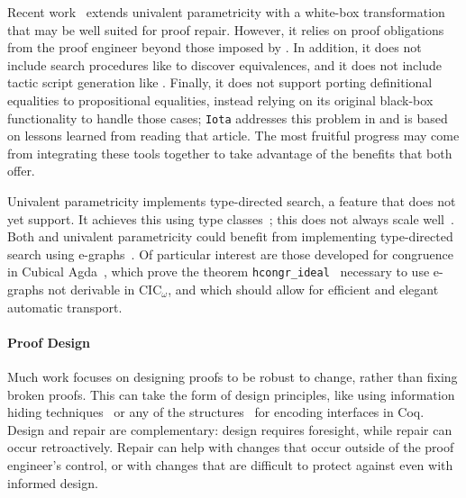 Recent work~\cite{tabareau2019marriage} extends univalent parametricity with 
a white-box transformation that may be well suited for proof repair.
However, it relies on proof obligations from the proof engineer beyond those imposed by \toolname.
In addition, it does not include search procedures like \toolname to discover equivalences,
and it does not include tactic script generation like \toolname.
Finally, it does not support porting definitional equalities to propositional equalities,
instead relying on its original black-box functionality to handle those cases;
\lstinline{Iota} addresses this problem in \toolname and is based on lessons learned from reading that article.
The most fruitful progress may come from integrating these tools together to take advantage of the benefits that both offer.

Univalent parametricity implements type-directed search, a feature that \toolname does not yet support.
It achieves this using type classes~\cite{Sozeau2008}; this does not always scale well~\cite{tabareau2019marriage}.
Both \toolname and univalent parametricity could benefit from implementing type-directed search using e-graphs~\cite{egraph1}.
Of particular interest are those developed for congruence in Cubical Agda~\cite{egraph6},
which prove the theorem \lstinline{hcongr_ideal}~\cite{egraph7} necessary to use e-graphs not derivable in CIC$_{\omega}$,
and which should allow for efficient and elegant automatic transport.

\paragraph{Proof Design}

Much work focuses on designing proofs
to be robust to change, rather than fixing broken proofs.
This can take the form of design principles, like using 
information hiding techniques~\cite{Woos:2016:PCF:2854065.2854081, Klein:2014:CFV:2584468.2560537}
or any of the structures~\cite{Chrzaszcz2003, Sozeau2008, Saibi:PhD} for encoding interfaces in Coq.
Design and repair are complementary: design requires foresight, while repair can occur retroactively.
Repair can help with changes that occur outside of the proof engineer's control,
or with changes that are difficult to protect against even with informed design.


